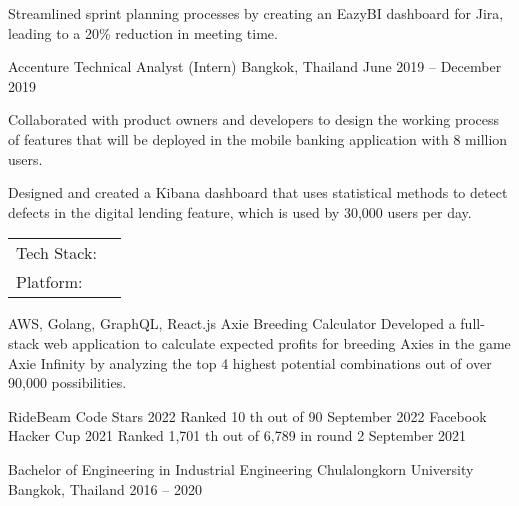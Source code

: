 \documentclass[]{awesome-cv}
\begin{document}
\begin{cventries}
{\begin{cvitems}
			\item {Streamlined sprint planning processes by creating an EazyBI dashboard for Jira,\\ leading to a 20\% reduction in meeting time.}
		\end{cvitems}}
	\cventry
	{Accenture}
	{Technical Analyst (Intern)}
	{Bangkok, Thailand}
	{June 2019 – December 2019}
	{\begin{cvitems}
			\item {Collaborated with product owners and developers to design the working process\\ of features that will be deployed in the mobile banking application with 8 million users.}
			\item {Designed and created a Kibana dashboard that uses statistical methods to detect\\ defects in the digital lending feature, which is used by 30,000 users per day.}
		\end{cvitems}}
\end{cventries}

\vspace{-4mm}
\begin{cventries}
	\cventry
	{}
	{\def\arraystretch{1.15}{\begin{tabular}{ l l }
				Tech Stack: & {\skill{ Kotlin, Flutter, Golang, TypeScript, node.js, React.js, PostgreSQL, MongoDB}} \\
				Platform:   & {\skill{ AWS, OpenShift, Docker, Control-M}}          \\
			\end{tabular}}}
	{}
	{}
	{}
\end{cventries}

\vspace{-8mm}
\begin{cventries}
	\cventry
	{AWS, Golang, GraphQL, React.js}
	{Axie Breeding Calculator}
	{}
	{}
	{Developed a full-stack web application to calculate expected profits for breeding Axies in the game Axie Infinity by analyzing the top 4 highest potential combinations out of over 90,000 possibilities.}
\end{cventries}

\begin{cvhonors}
	\cvhonor
	{RideBeam Code Stars 2022}
	{Ranked 10 th out of 90}
	{September 2022}
	\cvhonor
	{Facebook Hacker Cup 2021}
	{Ranked 1,701 th out of 6,789 in round 2}
	{September 2021}
\end{cvhonors}

\begin{cventries}
	\cventry
	{Bachelor of Engineering in Industrial Engineering}
	{Chulalongkorn University}
	{Bangkok, Thailand}
	{2016 – 2020}
	{}
\end{cventries}

\vspace{-2mm}
\
\end{document}
